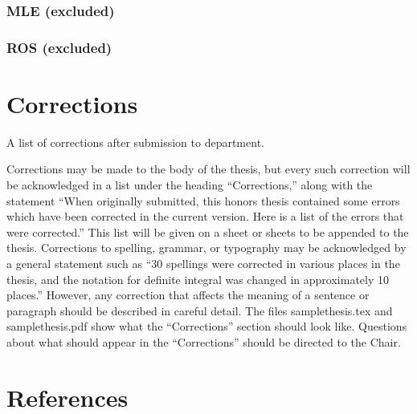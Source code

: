 \documentclass[12pt, twoside]{amherstthesis}
\begin{document}
\hypertarget{mle-excluded}{%
\subsection{MLE (excluded)}\label{mle-excluded}}

\hypertarget{ros-excluded}{%
\subsection{ROS (excluded)}\label{ros-excluded}}

\hypertarget{corrections}{%
\chapter*{Corrections}\label{corrections}}

A list of corrections after submission to department.

Corrections may be made to the body of the thesis, but every such correction will be acknowledged in a list under the heading ``Corrections,'' along with the statement ``When originally submitted, this honors thesis contained some errors which have been corrected in the current version. Here is a list of the errors that were corrected.'' This list will be given on a sheet or sheets to be appended to the thesis. Corrections to spelling, grammar, or typography may be acknowledged by a general statement such as ``30 spellings were corrected in various places in the thesis, and the notation for definite integral was changed in approximately 10 places.'' However, any correction that affects the meaning of a sentence or paragraph should be described in careful detail. The files samplethesis.tex and samplethesis.pdf show what the ``Corrections'' section should look like. Questions about what should appear in the ``Corrections'' should be directed to the Chair.

\backmatter

\hypertarget{references}{%
\chapter*{References}\label{references}}

\noindent

\setlength{\parindent}{-0.20in}
\setlength{\leftskip}{0.20in}
\setlength{\parskip}{8pt}
\end{document}
